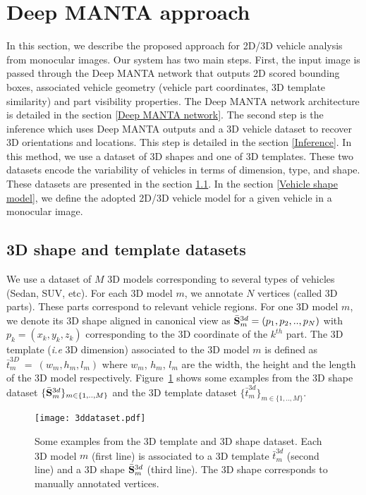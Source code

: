 \documentclass[10pt,twocolumn,letterpaper]{article}
\begin{document}
\section{Deep MANTA approach}  
\label{sec:method}

In this section, we describe the proposed approach for 2D/3D vehicle analysis from monocular images. Our system has two main steps. First, the input image is passed through the Deep MANTA network that outputs 2D scored bounding boxes, associated vehicle geometry (vehicle part coordinates, 3D template similarity) and part visibility properties. The Deep MANTA network architecture is detailed in the section \ref{Deep MANTA network}. The second step is the inference which uses Deep MANTA outputs and a 3D vehicle dataset to recover 3D orientations and locations. This step is detailed in the section  \ref{Inference}. 
In this method, we use a dataset of 3D shapes and one of 3D templates. These two datasets encode the variability of vehicles in terms of dimension, type, and shape. These datasets are presented in the section \ref{3dshapetemplate}. In the section \ref{Vehicle shape model}, we define the adopted 2D/3D vehicle model for a given vehicle in a monocular image. 


\subsection{3D shape and template datasets}
\label{3dshapetemplate}

We use a dataset of $M$ 3D models corresponding to several types of vehicles (Sedan, SUV, etc). For each 3D model $m$, we annotate $N$ vertices (called 3D parts). These parts correspond to relevant vehicle regions. For one 3D model $m$, we denote its 3D shape aligned in canonical view as $\bar{\bold{S}}_m^{3d}=(p_1,p_2,..,p_N)$ with $p_k = (x_k,y_k,z_k)$ corresponding to the 3D coordinate of the $k^{th}$ part. The 3D template (\textit{i.e} 3D dimension) associated to the 3D model $m$ is defined as~ $\bar{t}^{3D}_m~=~(w_m,h_m,l_m)$ where $w_m$, $h_m$, $l_m$ are the width, the height and the length of the 3D model respectively. Figure~\ref{fig:3ddataset} shows some examples from the 3D shape dataset $\{\bar{\bold{S}}_m^{3d}\}_{m \in \{1,.., M\}}$ and the 3D template dataset $\{\bar{t}^{3d}_m\}_{m \in \{1,.., M\}}$. 

\begin{figure}[ht]
\texttt{[image: 3ddataset.pdf]}
\vspace{-3mm}
\caption{Some examples from the 3D template and 3D shape dataset. Each 3D model $m$ (first line) is associated to a 3D template $\bar{t}_m^{3d}$ (second line) and a 3D shape  $\bar{\bold{S}}_m^{3d}$ (third line). The 3D shape corresponds to manually annotated vertices. }
\label{fig:3ddataset}
\end{figure}
\end{document}
